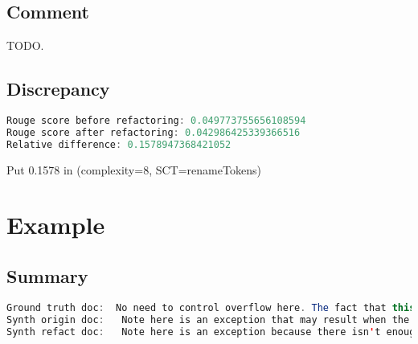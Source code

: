 \documentclass[11pt]{article}
\begin{document}
\subsection{Comment}

TODO.

\subsection{Discrepancy}

\begin{lstlisting}[language=java]
Rouge score before refactoring: 0.049773755656108594
Rouge score after refactoring: 0.042986425339366516
Relative difference: 0.1578947368421052
\end{lstlisting}

Put 0.1578 in (complexity=8, SCT=renameTokens)

\pagebreak
\section{Example}
\subsection{Summary}

\begin{lstlisting}[language=java]
Ground truth doc:  No need to control overflow here. The fact that this has overflow will be used as a flag to determine
Synth origin doc:   Note here is an exception that may result when the writer checks whether there exist problems or otherwise to
Synth refact doc:   Note here is an exception because there isn't enough logic in it and thus no assumption made there
\end{lstlisting}
\end{document}
